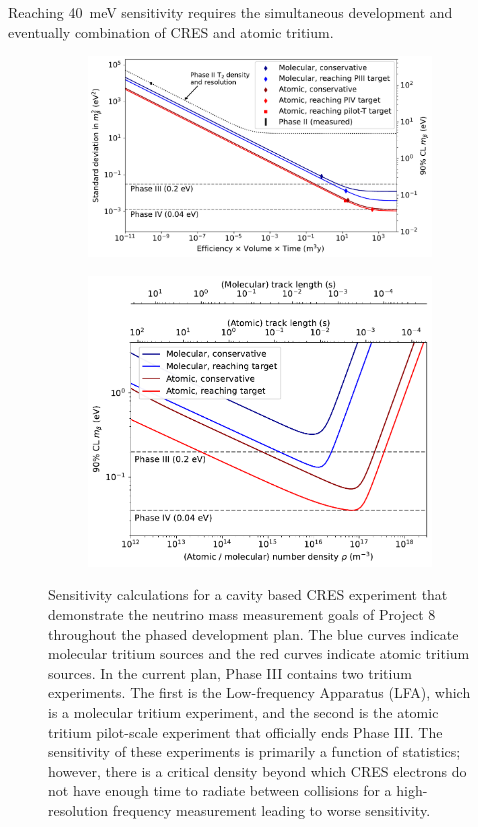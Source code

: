 Reaching 40~meV sensitivity requires the simultaneous development and eventually combination of CRES and atomic tritium.
\begin{figure}[htbp]
    \centering
    \begin{subfigure}{0.725\textwidth}
        \includegraphics*[width=\textwidth]{figs/Chapter-3/sensitivity_vs_exposure_curve.pdf}
    \end{subfigure}
    \begin{subfigure}{0.67\textwidth}
        \includegraphics*[width=\textwidth]{figs/Chapter-3/sensitivity_vs_density_curve.pdf}
    \end{subfigure}
    \caption{Sensitivity calculations for a cavity based CRES experiment that demonstrate the neutrino mass measurement goals of Project 8 throughout the phased development plan. The blue curves indicate molecular tritium sources and the red curves indicate atomic tritium sources. In the current plan, Phase III contains two tritium experiments. The first is the Low-frequency Apparatus (LFA), which is a molecular tritium experiment, and the second is the atomic tritium pilot-scale experiment that officially ends Phase III. The sensitivity of these experiments is primarily a function of statistics; however, there is a critical density beyond which CRES electrons do not have enough time to radiate between collisions for a high-resolution frequency measurement leading to worse sensitivity. }
\end{figure}
